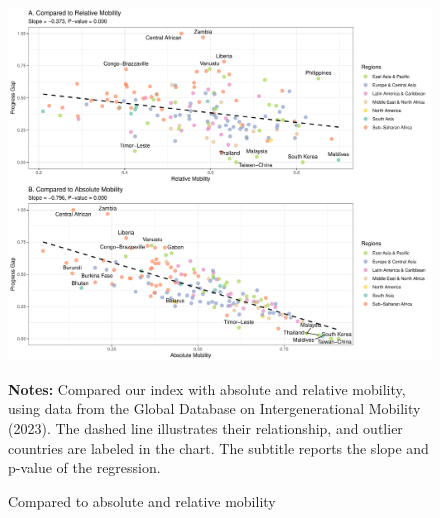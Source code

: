 \begin{figure}[h!]
    \centering
    \includegraphics[width=1\linewidth]{figs/internal.pdf}
    \caption{Compared to absolute and relative mobility}
    \label{fig:internal}
  \begin{minipage}{1\linewidth}
  	\vspace{0.2cm}
  	\footnotesize
  	\textbf{Notes:} Compared our index with absolute and relative mobility, using data from the Global Database on Intergenerational Mobility (2023). The dashed line illustrates their relationship, and outlier countries are labeled in the chart. The subtitle reports the slope and p-value of the regression.
  \end{minipage}
\end{figure}

